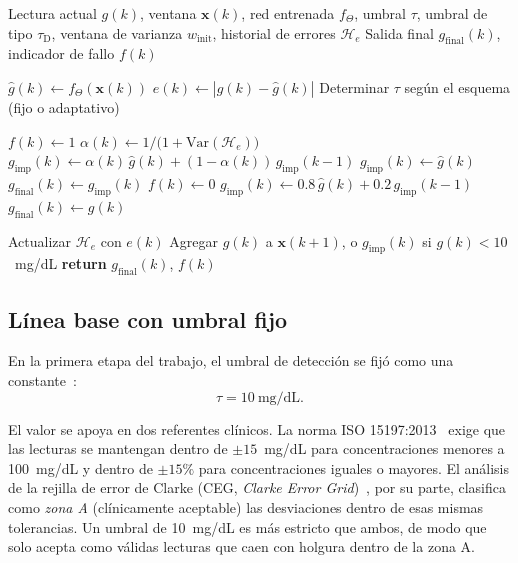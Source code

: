 \documentclass{report}
\begin{document}
\begin{algorithm}[h]
\caption{Detección de fallos e imputación en línea (esquema común).}
\label{alg:deteccion_imputacion}
\begin{algorithmic}[1]
\Require Lectura actual $g(k)$, ventana $\mathbf{x}(k)$, red entrenada $f_{\Theta}$, umbral $\tau$, umbral de tipo $\tau_{\mathrm{D}}$, ventana de varianza $w_{\mathrm{init}}$, historial de errores $\mathcal{H}_e$
\Ensure Salida final $g_{\mathrm{final}}(k)$, indicador de fallo $f(k)$

\State $\hat{g}(k) \gets f_{\Theta}(\mathbf{x}(k))$ 
\State $e(k) \gets |g(k) - \hat{g}(k)|$ 
\State Determinar $\tau$ según el esquema (fijo o adaptativo)

    \State $f(k) \gets 1$ 
        \State $\alpha(k) \gets 1 / \big(1 + \mathrm{Var}(\mathcal{H}_e)\big)$
        \State $g_{\mathrm{imp}}(k) \gets \alpha(k)\,\hat{g}(k) + (1 - \alpha(k))\,g_{\mathrm{imp}}(k\!-\!1)$ 
    \Else
        \State $g_{\mathrm{imp}}(k) \gets \hat{g}(k)$ 
    \EndIf
    \State $g_{\mathrm{final}}(k) \gets g_{\mathrm{imp}}(k)$ 
\Else
    \State $f(k) \gets 0$ 
    \State $g_{\mathrm{imp}}(k) \gets 0.8\,\hat{g}(k) + 0.2\,g_{\mathrm{imp}}(k\!-\!1)$ 
    \State $g_{\mathrm{final}}(k) \gets g(k)$ 
\EndIf

\State Actualizar $\mathcal{H}_e$ con $e(k)$
\State Agregar $g(k)$ a $\mathbf{x}(k\!+\!1)$, o $g_{\mathrm{imp}}(k)$ si $g(k) < 10$~mg/dL 
\State \textbf{return} $g_{\mathrm{final}}(k)$, $f(k)$
\end{algorithmic}
\end{algorithm}

\subsection{Línea base con umbral fijo}
\label{subsec:umbral_fijo}

En la primera etapa del trabajo, el umbral de detección se fijó como una constante~\cite{sanchez2025imputation}:
\begin{equation}
\label{eq:umbral_fijo}
\tau = 10 \ \text{mg/dL}.
\end{equation}

El valor se apoya en dos referentes clínicos. La norma ISO 15197:2013~\cite{iso15197_2013} exige que las lecturas se mantengan dentro de $\pm 15$~mg/dL para concentraciones menores a 100~mg/dL y dentro de $\pm 15\%$ para concentraciones iguales o mayores. El análisis de la rejilla de error de Clarke (CEG, \textit{Clarke Error Grid})~\cite{clarke1987evaluating}, por su parte, clasifica como \textit{zona A} (clínicamente aceptable) las desviaciones dentro de esas mismas tolerancias. Un umbral de 10~mg/dL es más estricto que ambos, de modo que solo acepta como válidas lecturas que caen con holgura dentro de la zona A.
\end{document}
